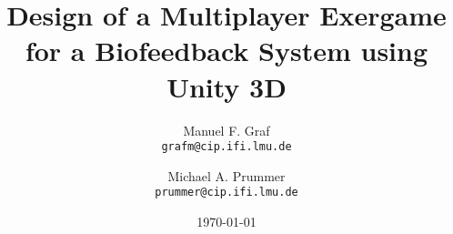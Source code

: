 


\author{ 
Manuel F. Graf\\
  \texttt{grafm@cip.ifi.lmu.de}
  \and
  Michael A. Prummer\\
  \texttt{prummer@cip.ifi.lmu.de}
}
\title{Design of a Multiplayer Exergame for a Biofeedback System using Unity 3D
}
\date{\today}





\maketitle

\textbf{}

